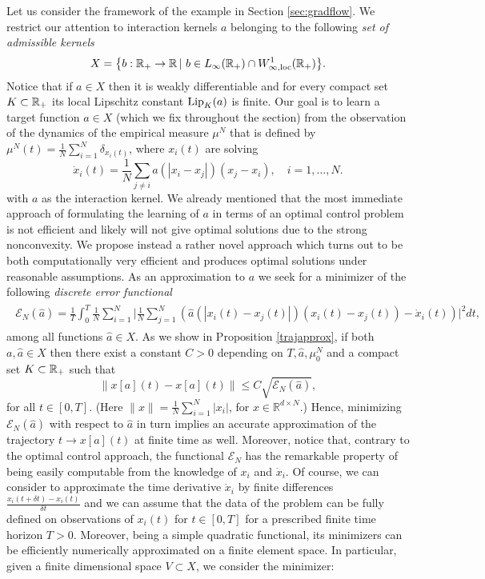 Let us consider the framework of the example in Section \ref{sec:gradflow}. We restrict our attention to interaction kernels $a$ belonging to the following \textit{set of admissible kernels}
\begin{align*}
	X=\bigl\{b:\mathbb{R}_+\rightarrow\mathbb{R}\,|\ b \in L_{\infty}(\mathbb{R}_+) \cap W^{1}_{\infty,\textup{loc}}(\mathbb{R}_+) \bigr \}.
\end{align*}
Notice that if $a \in X$ then it is weakly differentiable and for every compact set $K \subset \mathbb{R}_+$ its local Lipschitz constant $\textup{Lip}_{K}(a)$ is finite.
Our goal is to learn a target function $a \in X$ (which we fix throughout the section) from the observation of the dynamics of the empirical measure $\mu^N$ that is defined by $\mu^N(t)=\frac{1}{N} \sum_{i=1}^N \delta_{x_i(t)}$, where $x_i(t)$ are solving
\begin{equation}\label{fdgradientflow2}
\dot x_i(t) = \frac{1}{N} \sum_{j \neq i} a(| x_i -  x_j |) (x_j - x_i), \quad i=1,\dots,N.
\end{equation}
with $a$ as the interaction kernel. We already mentioned that the  most immediate approach of formulating the learning of $a$ in terms of an optimal control problem is not efficient and likely will not give optimal solutions due to the strong nonconvexity. We propose instead a rather novel approach which turns out to be both computationally very efficient and   produces optimal solutions under reasonable assumptions. As an approximation to $a$ we seek for a minimizer of the following \textit{discrete error functional}
\begin{align}\label{eq-def-error1}
	\begin{split}
	\mathcal E_N(\widehat a) = \frac{1}{T}\int_0^T\frac{1}{N}\sum_{i=1}^N\biggl|\frac{1}{N}\sum_{j=1}^N
			\left(\widehat a(|x_i(t)-x_j(t)|)(x_i(t) - x_j(t))-\dot{x}_i(t)\right)\biggr|^2 dt,
	\end{split}
\end{align}
among all functions $\widehat a \in X$. As we show in Proposition \ref{trajapprox}, if both $a, \widehat a \in X$ then there exist a constant $C>0$ depending on $T, \widehat a, \mu_0^N$ and a compact set $K \subset \mathbb{R}_+$ such that
$$
\| x[a](t) -x[a](t) \| \leq C \sqrt{\mathcal E_N(\widehat a)}, 
$$
for all $t \in [0,T]$. (Here $\| x \| = \frac{1}{N} \sum_{i=1}^N |x_i|$, for $x \in \mathbb R^{d \times N}$.) Hence, minimizing $\mathcal E_N(\widehat a)$ with respect to $\widehat a$ in turn implies an accurate approximation of the trajectory $t \to x[a](t)$ at finite time as well. Moreover,
notice that, contrary to the optimal control approach, the functional $\mathcal E_N$ has the remarkable property of being easily computable from the knowledge of $x_i$ and $\dot{x}_i$. Of course, we can consider to approximate the time derivative $\dot{x}_i$ by finite differences $\frac{x_i(t+\delta t)- x_i(t)}{\delta t}$ and we can assume that the data of the problem can be fully defined on observations of $x_i(t)$ for $t \in [0,T]$ for a prescribed finite time horizon $T>0$. Moreover, being a simple quadratic functional, its minimizers can be efficiently numerically approximated on a finite element space. In particular, given a finite dimensional space $V \subset X$, we consider the minimizer:
